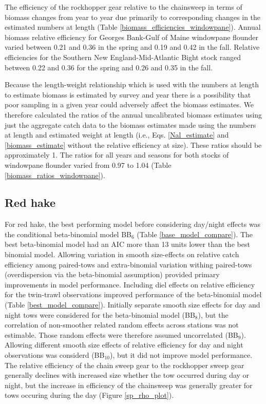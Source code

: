 \documentclass[]{article}
\begin{document}
The efficiency of the rockhopper gear relative to the chainsweep in
terms of biomass changes from year to year due primarily to
corresponding changes in the estimated numbers at length (Table
\ref{biomass_efficiencies_windowpane}). Annual biomass relative
efficiency for Georges Bank-Gulf of Maine windowpane flounder varied
between 0.21 and 0.36 in the spring and 0.19 and 0.42 in the fall.
Relative efficiencies for the Southern New England-Mid-Atlantic Bight
stock ranged between 0.22 and 0.36 for the spring and 0.26 and 0.35 in
the fall.

Because the length-weight relationship which is used with the numbers at
length to estimate biomass is estimated by survey and year there is a
possibility that poor sampling in a given year could adversely affect
the biomass estimates. We therefore calculated the ratios of the annual
uncalibrated biomass estimates using just the aggregate catch data to
the biomass estimates made using the numbers at length and estimated
weight at length (i.e., Eqs. \ref{Nal_estimate} and
\ref{biomass_estimate} without the relative efficiency at size). These
ratios should be approximately 1. The ratios for all years and seasons
for both stocks of windowpane flounder varied from 0.97 to 1.04 (Table
\ref{biomass_ratios_windowpane}).

\hypertarget{red-hake}{%
\subsection{Red hake}\label{red-hake}}

For red hake, the best performing model before considering day/night
effects was the conditional beta-binomial model BB\(_6\) (Table
\ref{base_model_compare}). The best beta-binomial model had an AIC more
than 13 units lower than the best binomial model. Allowing variation in
smooth size-effects on relative catch efficiency among paired-tows and
extra-binomial variation withing paired-tows (overdispersion via the
beta-binomial assumption) provided primary improvements in model
performance. Including diel effects on relative efficiency for the
twin-trawl observations improved performance of the beta-binomial model
(Table \ref{best_model_compare}). Initially separate smooth size effects
for day and night tows were considered for the beta-binomial model
(BB\(_8\)), but the correlation of non-smoother related random effects
across stations was not estimable. Those random effects were therefore
assumed uncorrelated (BB\(_9\)). Allowing different smooth size effects
of relative efficiency for day and night observations was considerd
(BB\(_{10}\)), but it did not improve model performance. The relative
efficiency of the chain sweep gear to the rockhopper sweep gear
generally declines with increased size whether the tow occurred during
day or night, but the increase in efficiency of the chainsweep was
generally greater for tows occuring during the day (Figure
\ref{sp_rho_plot}).
\end{document}
